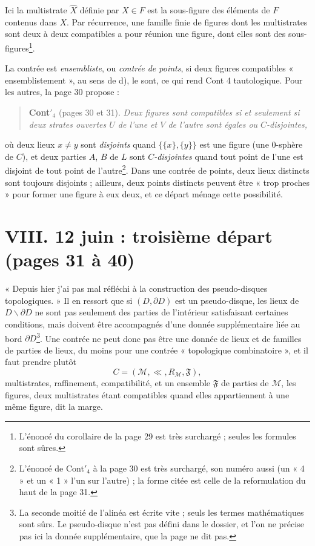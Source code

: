 \documentclass[11pt,a4paper]{article}
\begin{document}
Ici la multistrate $\widehat{X}$ définie par $X \in F$ est la sous-figure des
éléments de $F$ contenus dans $X$. Par récurrence, une famille finie de figures
dont les multistrates sont deux à deux compatibles a pour réunion une figure,
dont elles sont des sous-figures\footnote{L'énoncé du corollaire de la page 29
est très surchargé ; seules les formules sont sûres.}.

La contrée est \emph{ensembliste}, ou \emph{contrée de points}, si deux figures
compatibles « ensemblistement », au sens de d), le sont, ce qui rend Cont
4 tautologique. Pour les autres, la page 30 propose :

\begin{quote}
\textbf{Cont}$'_{4}$ (pages 30 et 31). \emph{Deux figures sont compatibles si et
seulement si deux strates ouvertes $U$ de l'une et $V$ de l'autre sont égales
ou $C$-disjointes,}
\end{quote}
où deux lieux $x \neq y$ sont \emph{disjoints} quand $\{\{x\}, \{y\}\}$ est une
figure (une $0$-sphère de $C$), et deux parties $A$, $B$ de $L$ sont
\emph{$C$-disjointes} quand tout point de l'une est disjoint de tout point de
l'autre\footnote{L'énoncé de Cont$'_{4}$ à la page 30 est très surchargé, son
numéro aussi (un « 4 » et un « 1 » l'un sur l'autre) ; la forme citée est celle
de la reformulation du haut de la page 31.}. Dans une contrée de points, deux
lieux distincts sont toujours disjoints ; ailleurs, deux points distincts
peuvent être « trop proches » pour former une figure à eux deux, et ce départ
ménage cette possibilité.

\section*{VIII. 12 juin : troisième départ (pages 31 à 40)}

« Depuis hier j'ai pas mal réfléchi à la construction des pseudo-disques
topologiques. » Il en ressort que si $(D, \partial D)$ est un pseudo-disque, les
lieux de $D \smallsetminus \partial D$ ne sont pas seulement des parties de
l'intérieur satisfaisant certaines conditions, mais doivent être accompagnés
d'une donnée supplémentaire liée au bord $\partial D$\footnote{La seconde moitié
de l'alinéa est écrite vite ; seuls les termes mathématiques sont sûrs. Le
pseudo-disque n'est pas défini dans le dossier, et l'on ne précise pas ici la
donnée supplémentaire, que la page ne dit pas.}. Une contrée ne peut donc pas
être une donnée de lieux et de familles de parties de lieux, du moins pour une
contrée « topologique combinatoire », et il faut prendre plutôt
\[
C = (\mathcal{M}, \ll, R_{\mathcal{M}}, \mathfrak{F}),
\]
multistrates, raffinement, compatibilité, et un ensemble $\mathfrak{F}$ de
parties de $\mathcal{M}$, les figures, deux multistrates étant compatibles
quand elles appartiennent à une même figure, dit la marge.
\end{document}
